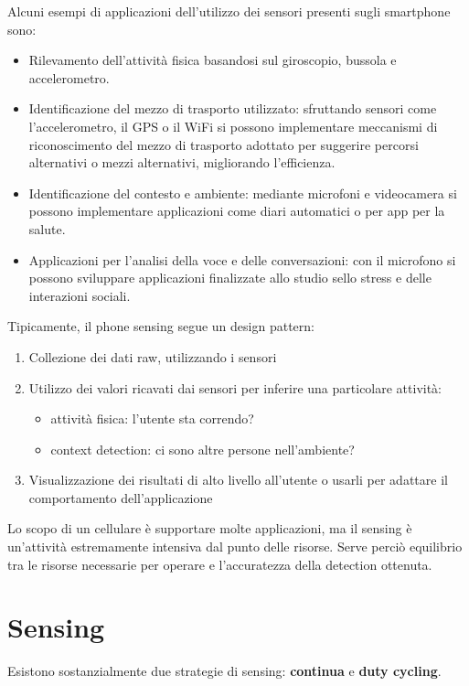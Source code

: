 Alcuni esempi di applicazioni dell'utilizzo dei sensori presenti sugli smartphone sono:
\begin{itemize}
\item Rilevamento dell'attività fisica basandosi sul giroscopio, bussola e accelerometro.
\item Identificazione del mezzo di trasporto utilizzato: sfruttando sensori come l'accelerometro, il GPS o il WiFi si possono implementare meccanismi di riconoscimento del mezzo di trasporto adottato per suggerire percorsi alternativi o mezzi alternativi, migliorando l'efficienza.
\item Identificazione del contesto e ambiente: mediante microfoni e videocamera si possono
implementare applicazioni come diari automatici o per app per la salute.
\item Applicazioni per l'analisi della voce e delle conversazioni: con il
microfono si possono sviluppare applicazioni finalizzate allo studio sello stress
e delle interazioni sociali.
\end{itemize}

Tipicamente, il phone sensing segue un design pattern:
\begin{enumerate}
	\item Collezione dei dati raw, utilizzando i sensori
	\item Utilizzo dei valori ricavati dai sensori per inferire una particolare attività:
	\begin{itemize}
		\item attività fisica: l'utente sta correndo?
		\item context detection: ci sono altre persone nell'ambiente?
	\end{itemize}
	\item Visualizzazione dei risultati di alto livello all'utente o usarli per adattare il
comportamento dell'applicazione
\end{enumerate}

Lo scopo di un cellulare è supportare molte applicazioni, ma il sensing è
un'attività estremamente intensiva dal punto delle risorse. Serve perciò
equilibrio tra le risorse necessarie per operare e l'accuratezza della detection
ottenuta.

\section{Sensing}

Esistono sostanzialmente due strategie di sensing: \textbf{continua} e \textbf{duty cycling}.

